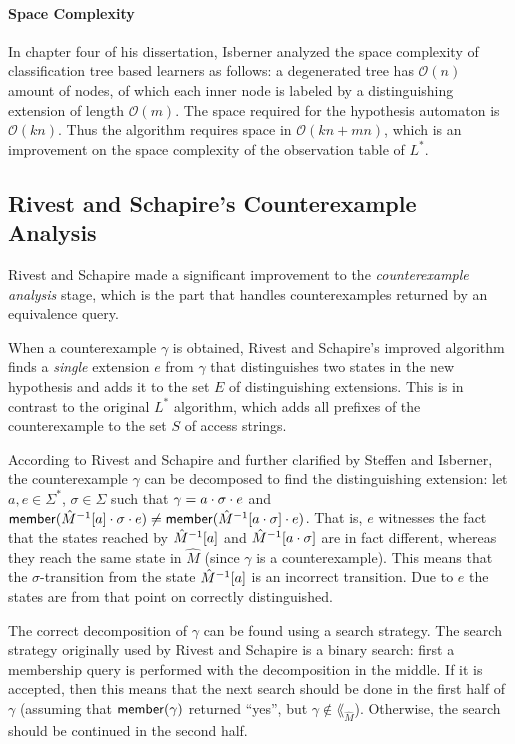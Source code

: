 \documentclass[multi,crop=false,class=article]{standalone}
\begin{document}
\paragraph{Space Complexity} In chapter four of his dissertation, Isberner
analyzed the space complexity of classification tree based learners as follows:
a degenerated tree has $\mathcal{O}(n)$ amount of nodes, of which each inner
node is labeled by a distinguishing extension of length
$\mathcal{O}(m)$\cite{Isberner2015a}. The space required for the hypothesis
automaton is $\mathcal{O}(kn)$\cite{Isberner2015a}. Thus the algorithm requires
space in $\mathcal{O}(kn + mn)$\cite{Isberner2014b,Isberner2015a}, which is an
improvement on the space complexity of the observation table of $L^*$.

\subsection{Rivest and Schapire's Counterexample Analysis}
\label{sec:rivest-schap-count}
Rivest and Schapire made a significant improvement\cite{Rivest1993} to the
\textit{counterexample analysis} stage, which is the part that handles
counterexamples returned by an equivalence query.

When a counterexample $\gamma$ is obtained, Rivest and Schapire's improved
algorithm finds a \textit{single} extension $e$ from $\gamma$ that distinguishes
two states in the new hypothesis and adds it to the set $E$ of distinguishing
extensions. This is in contrast to the original $L^*$ algorithm, which adds all
prefixes of the counterexample to the set $S$ of access strings.

According to Rivest and Schapire\cite{Rivest1993} and further clarified by
Steffen\cite{Steffen2011} and Isberner\cite{Isberner2014a}, the counterexample
$\gamma$ can be decomposed to find the distinguishing extension: let
$a, e \in \Sigma^*$, $\sigma \in \Sigma$ such that
$\gamma = a \cdot \sigma \cdot e$ and
$\mathsf{member}(\hat M^{-1}[a]\cdot\sigma\cdot e) \neq \mathsf{member}(\hat
  M^{-1}[a\cdot\sigma]\cdot e)$. That is, $e$ witnesses the fact that the states
reached by $\hat M^{-1}[a]$ and $\hat M^{-1}[a\cdot\sigma]$ are in
fact different, whereas they reach the same state in $\hat M$ (since $\gamma$ is
a counterexample). This means that the $\sigma$-transition from the state
$\hat M^{-1}[a]$ is an incorrect transition. Due to $e$ the states are from
that point on correctly distinguished.

The correct decomposition of $\gamma$ can be found using a search strategy. The
search strategy originally used by Rivest and Schapire is a binary search: first
a membership query is performed with the decomposition in the middle. If it is
accepted, then this means that the next search should be done in the first half
of $\gamma$ (assuming that $\mathsf{member}(\gamma)$ returned ``yes'', but $\gamma
\not\in \lang_{\hat M}$). Otherwise, the search should be continued in the
second half.
\end{document}
